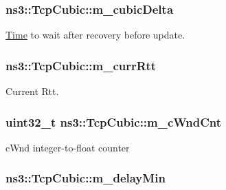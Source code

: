 \subsubsection[{\texorpdfstring{m\+\_\+cubic\+Delta}{m_cubicDelta}}]{ ns3\+::\+Tcp\+Cubic\+::m\+\_\+cubic\+Delta\hspace{0.3cm}{\ttfamily [private]}}\hypertarget{classns3_1_1TcpCubic_a10b3b2aedb75eb85ecf5e339462def08}{}\label{classns3_1_1TcpCubic_a10b3b2aedb75eb85ecf5e339462def08}


\hyperlink{classns3_1_1Time}{Time} to wait after recovery before update. 

\subsubsection[{\texorpdfstring{m\+\_\+curr\+Rtt}{m_currRtt}}]{ ns3\+::\+Tcp\+Cubic\+::m\+\_\+curr\+Rtt\hspace{0.3cm}{\ttfamily [private]}}\hypertarget{classns3_1_1TcpCubic_a0082d2bc456e29345d611b313091bbab}{}\label{classns3_1_1TcpCubic_a0082d2bc456e29345d611b313091bbab}


Current Rtt. 

\subsubsection[{\texorpdfstring{m\+\_\+c\+Wnd\+Cnt}{m_cWndCnt}}]{\setlength{\rightskip}{0pt plus 5cm}uint32\+\_\+t ns3\+::\+Tcp\+Cubic\+::m\+\_\+c\+Wnd\+Cnt\hspace{0.3cm}{\ttfamily [private]}}\hypertarget{classns3_1_1TcpCubic_a56b424a0e9790d9ef8b2b2ea6b399d49}{}\label{classns3_1_1TcpCubic_a56b424a0e9790d9ef8b2b2ea6b399d49}


c\+Wnd integer-\/to-\/float counter 

\subsubsection[{\texorpdfstring{m\+\_\+delay\+Min}{m_delayMin}}]{ ns3\+::\+Tcp\+Cubic\+::m\+\_\+delay\+Min\hspace{0.3cm}{\ttfamily [private]}}\hypertarget{classns3_1_1TcpCubic_a97143c4377ca57cac3095206a85e8db0}{}\label{classns3_1_1TcpCubic_a97143c4377ca57cac3095206a85e8db0}


